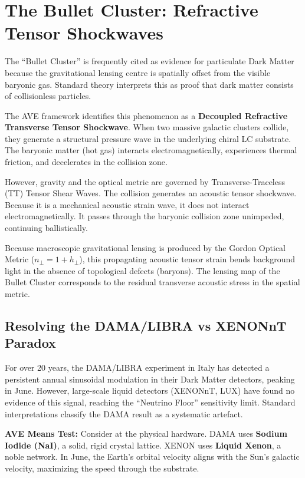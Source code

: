 \section{The Bullet Cluster: Refractive Tensor Shockwaves}
The ``Bullet Cluster'' is frequently cited as evidence for particulate Dark Matter because the gravitational lensing centre is spatially offset from the visible baryonic gas. Standard theory interprets this as proof that dark matter consists of collisionless particles.

The AVE framework identifies this phenomenon as a \textbf{Decoupled Refractive Transverse Tensor Shockwave}. When two massive galactic clusters collide, they generate a structural pressure wave in the underlying chiral LC substrate. The baryonic matter (hot gas) interacts electromagnetically, experiences thermal friction, and decelerates in the collision zone.

However, gravity and the optical metric are governed by Transverse-Traceless (TT) Tensor Shear Waves. The collision generates an acoustic tensor shockwave. Because it is a mechanical acoustic strain wave, it does not interact electromagnetically. It passes through the baryonic collision zone unimpeded, continuing ballistically. 

Because macroscopic gravitational lensing is produced by the Gordon Optical Metric ($n_\perp = 1 + h_\perp$), this propagating acoustic tensor strain bends background light in the absence of topological defects (baryons). The lensing map of the Bullet Cluster corresponds to the residual transverse acoustic stress in the spatial metric.

\subsection{Resolving the DAMA/LIBRA vs XENONnT Paradox}
For over 20 years, the DAMA/LIBRA experiment in Italy has detected a persistent annual sinusoidal modulation in their Dark Matter detectors, peaking in June. However, large-scale liquid detectors (XENONnT, LUX) have found no evidence of this signal, reaching the ``Neutrino Floor'' sensitivity limit. Standard interpretations classify the DAMA result as a systematic artefact.

\textbf{AVE Means Test:} Consider at the physical hardware. DAMA uses \textbf{Sodium Iodide (NaI)}, a solid, rigid crystal lattice. XENON uses \textbf{Liquid Xenon}, a noble network. In June, the Earth's orbital velocity aligns with the Sun's galactic velocity, maximizing the speed through the substrate. 

